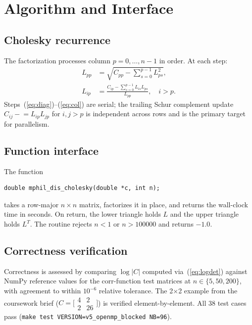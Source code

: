 \documentclass{article}
\begin{document}
\section{Algorithm and Interface}

\subsection{Cholesky recurrence}

The factorization processes column $p = 0,\ldots,n-1$ in order.
At each step:
\begin{align}
  L_{pp} &= \sqrt{C_{pp} - \sum_{s=0}^{p-1} L_{ps}^2},
  \label{eq:diag}\\
  L_{ip} &= \frac{C_{ip} - \sum_{s=0}^{p-1} L_{is}L_{ps}}{L_{pp}},
  \quad i > p.
  \label{eq:col}
\end{align}
Steps~(\ref{eq:diag})--(\ref{eq:col}) are serial; the trailing Schur complement
update $C_{ij} \mathrel{-}= L_{ip}L_{jp}$ for $i,j>p$ is independent across
rows and is the primary target for parallelism.

\subsection{Function interface}

The function
\begin{verbatim}
double mphil_dis_cholesky(double *c, int n);
\end{verbatim}
takes a row-major $n\times n$ matrix, factorizes it in place, and returns the
wall-clock time in seconds.
On return, the lower triangle holds $L$ and the upper triangle holds $L^T$.
The routine rejects $n < 1$ or $n > 100000$ and returns $-1.0$.

\subsection{Correctness verification}

Correctness is assessed by comparing $\log|C|$ computed via~(\ref{eq:logdet})
against NumPy reference values for the corr-function test matrices at
$n \in \{5, 50, 200\}$, with agreement to within $10^{-6}$ relative tolerance.
The 2$\times$2 example from the coursework brief ($C = \bigl[\begin{smallmatrix}4&2\\2&26\end{smallmatrix}\bigr]$)
is verified element-by-element.
All 38 test cases pass (\texttt{make test VERSION=v5\_openmp\_blocked NB=96}).
\end{document}
